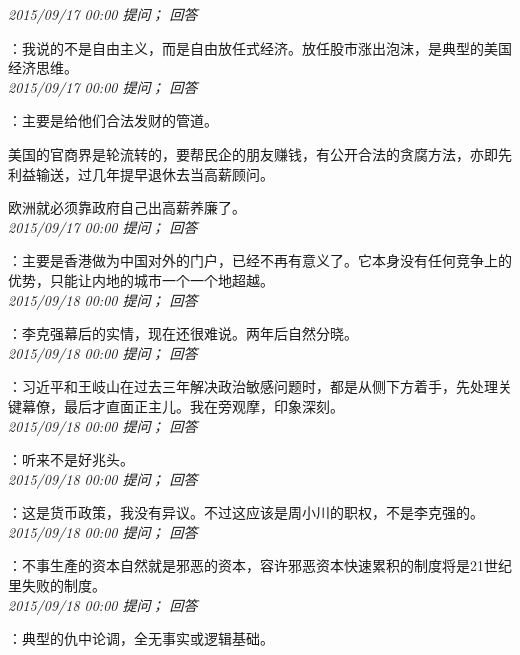 \documentclass[twocolumn]{ctexart}
\begin{document}
\textit{\hfill\noindent\small 2015/09/17 00:00 提问； 回答}

：我说的不是自由主义，而是自由放任式经济。放任股市涨出泡沫，是典型的美国经济思维。\\

\textit{\hfill\noindent\small 2015/09/17 00:00 提问； 回答}

：主要是给他们合法发财的管道。

美国的官商界是轮流转的，要帮民企的朋友赚钱，有公开合法的贪腐方法，亦即先利益输送，过几年提早退休去当高薪顾问。

欧洲就必须靠政府自己出高薪养廉了。\\

\textit{\hfill\noindent\small 2015/09/17 00:00 提问； 回答}

：主要是香港做为中国对外的门户，已经不再有意义了。它本身没有任何竞争上的优势，只能让内地的城市一个一个地超越。\\

\textit{\hfill\noindent\small 2015/09/18 00:00 提问； 回答}

：李克强幕后的实情，现在还很难说。两年后自然分晓。\\

\textit{\hfill\noindent\small 2015/09/18 00:00 提问； 回答}

：习近平和王岐山在过去三年解决政治敏感问题时，都是从侧下方着手，先处理关键幕僚，最后才直面正主儿。我在旁观摩，印象深刻。\\

\textit{\hfill\noindent\small 2015/09/18 00:00 提问； 回答}

：听来不是好兆头。\\

\textit{\hfill\noindent\small 2015/09/18 00:00 提问； 回答}

：这是货币政策，我没有异议。不过这应该是周小川的职权，不是李克强的。\\

\textit{\hfill\noindent\small 2015/09/18 00:00 提问； 回答}

：不事生產的资本自然就是邪恶的资本，容许邪恶资本快速累积的制度将是21世纪里失败的制度。\\

\textit{\hfill\noindent\small 2015/09/18 00:00 提问； 回答}

：典型的仇中论调，全无事实或逻辑基础。
\end{document}
